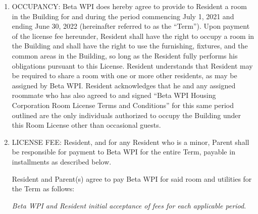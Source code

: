 \documentclass[legalpaper, 12pt]{article}
\begin{document}
\begin{enumerate} 

        
\item\label{itm:occupancy}

OCCUPANCY\@:  Beta WPI does hereby agree to   provide to Resident a room in the Building for and during the period commencing July 1, 2021 and ending June 30, 2022 (hereinafter referred to as the “Term”).
Upon payment of the license fee hereunder, Resident shall have the right to occupy a room in the Building and shall have the right to use the furnishing, fixtures, and the common areas in the Building, so long as the Resident fully performs his obligations pursuant to this License.
Resident understands that Resident may be required to share a room with one or more other residents, as may be assigned by Beta WPI\@.
Resident acknowledges that he and any assigned roommate who has also agreed to and signed “Beta WPI Housing Corporation Room License Terms and Conditions” for this same period outlined are the only individuals authorized to occupy the Building under this Room License other than occasional guests.

\item\label{itm:licensefee}

LICENSE FEE\@: Resident, and for any Resident who is a minor, Parent shall be responsible for payment to Beta WPI for the entire Term, payable in installments as described below.

Resident and Parent(s) agree to pay Beta WPI for said room and utilities for the Term as follows:

\textit{Beta WPI and Resident initial acceptance of fees for each applicable period}.


\end{enumerate}
\end{document}

